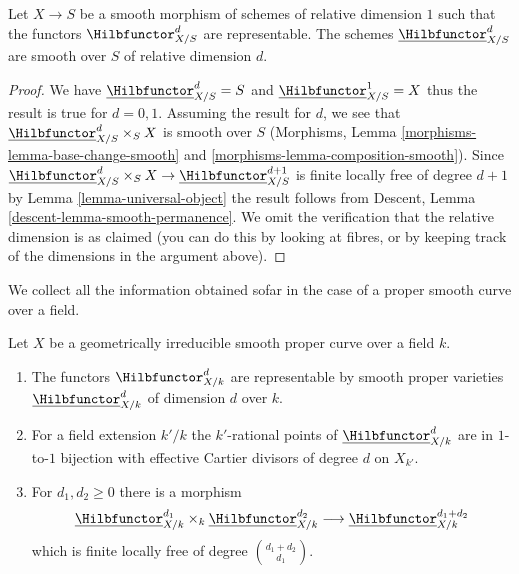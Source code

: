 \begin{lemma}
\label{lemma-hilb-d-smooth}
Let $X \to S$ be a smooth morphism of schemes of relative dimension $1$
such that the functors $\Hilbfunctor^d_{X/S}$ are representable. The
schemes $\underline{\Hilbfunctor}^d_{X/S}$ are smooth over $S$ of
relative dimension $d$.
\end{lemma}

\begin{proof}
We have $\underline{\Hilbfunctor}^d_{X/S} = S$ and
$\underline{\Hilbfunctor}^1_{X/S} = X$ thus the result is true for $d = 0, 1$.
Assuming the result for $d$, we see that
$\underline{\Hilbfunctor}^d_{X/S} \times_S X$ is smooth over $S$
(Morphisms, Lemma \ref{morphisms-lemma-base-change-smooth} and
\ref{morphisms-lemma-composition-smooth}). Since
$\underline{\Hilbfunctor}^d_{X/S} \times_S X \to
\underline{\Hilbfunctor}^{d + 1}_{X/S}$
is finite locally free of degree $d + 1$ by
Lemma \ref{lemma-universal-object}
the result follows from
Descent, Lemma \ref{descent-lemma-smooth-permanence}.
We omit the verification that the relative dimension is
as claimed (you can do this by looking at fibres, or by
keeping track of the dimensions in the argument above).
\end{proof}

\noindent
We collect all the information obtained sofar in the case of
a proper smooth curve over a field.

\begin{proposition}
\label{proposition-hilb-d}
Let $X$ be a geometrically irreducible smooth proper curve over a field $k$.
\begin{enumerate}
\item The functors $\Hilbfunctor^d_{X/k}$ are representable by smooth
proper varieties $\underline{\Hilbfunctor}^d_{X/k}$ of dimension
$d$ over $k$.
\item For a field extension $k'/k$ the $k'$-rational points
of $\underline{\Hilbfunctor}^d_{X/k}$ are in $1$-to-$1$ bijection
with effective Cartier divisors of degree $d$ on $X_{k'}$.
\item For $d_1, d_2 \geq 0$ there is a morphism
$$
\underline{\Hilbfunctor}^{d_1}_{X/k}
\times_k
\underline{\Hilbfunctor}^{d_2}_{X/k}
\longrightarrow
\underline{\Hilbfunctor}^{d_1 + d_2}_{X/k}
$$
which is finite locally free of degree ${d_1 + d_2 \choose d_1}$.
\end{enumerate}
\end{proposition}

